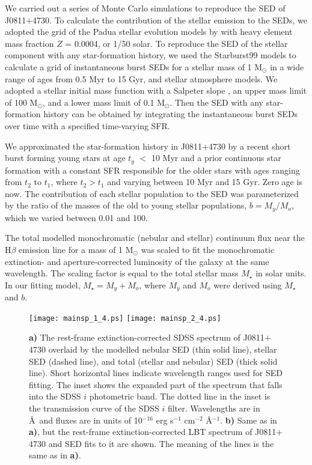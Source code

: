 \documentclass[useAMS,usenatbib]{mn2e}
\begin{document}
We carried out a series of Monte Carlo simulations to reproduce  the SED of
J0811$+$4730. To calculate the contribution of the  stellar  emission to the 
SEDs, we adopted the grid of the Padua stellar evolution models by \citet{G00}
with heavy element mass fraction $Z$ = 0.0004, or 1/50 solar. To reproduce the 
SED of the stellar component with any star-formation history, we used the 
{\sc Starburst99} models \citep{L99,L14} 
to calculate a grid of instantaneous
burst SEDs for a stellar mass of 1 M$_\odot$ in a wide range of ages
from 0.5 Myr to 15 Gyr, and \citet*{L97} stellar atmosphere models. 
We adopted a stellar initial mass function with a 
Salpeter slope \citep{S55}, an upper mass limit of 100 M$_\odot$, and a lower 
mass limit of 0.1 M$_\odot$. Then the SED with any star-formation history can 
be obtained by integrating the instantaneous burst SEDs over time with a 
specified time-varying SFR.

We approximated the star-formation history in J0811$+$4730
by a recent short burst forming young stars at age $t_y$ $<$ 10 Myr and a 
prior continuous star formation 
with a constant SFR responsible for the older stars with ages ranging from 
$t_2$ to $t_1$, where $t_2 > t_1$ and varying between 10 Myr and 
15 Gyr. Zero age is now. The contribution of each stellar population to the 
SED was parameterized by the ratio of the masses of the old to young stellar 
populations, $b=M_y/M_o$, which we varied between 0.01 and 100.

The total modelled  monochromatic (nebular and stellar)
continuum flux near the H$\beta$ emission line for a mass of 1 M$_\odot$
was scaled to fit the monochromatic extinction- and aperture-corrected 
luminosity of the galaxy at the same wavelength. The
scaling factor is equal to the total stellar mass $M_\star$ in solar units.
In our fitting model, $M_\star=M_y+M_o$, where $M_y$ and $M_o$ were derived 
using $M_\star$ and $b$.

\begin{figure}%
\texttt{[image: mainsp\_1\_4.ps]}
\texttt{[image: mainsp\_2\_4.ps]}
\caption{ {\bf a)} The rest-frame extinction-corrected SDSS spectrum of 
J0811$+$4730
overlaid by the modelled nebular SED (thin solid line), stellar SED (dashed
line), and total (stellar and nebular) SED (thick solid line).
Short horizontal lines indicate wavelength ranges used for SED fitting.
The inset shows the expanded part of the spectrum that falls into the SDSS $i$ 
photometric band. The dotted line in the inset is the transmission curve of the
SDSS $i$ filter. Wavelengths are in \AA\ and fluxes are in units of  
10$^{-16}$ erg s$^{-1}$ cm$^{-2}$ \AA$^{-1}$.
{\bf b)} Same as in {\bf a)}, but the rest-frame extinction-corrected LBT 
spectrum of J0811$+$4730 and SED fits to it are shown. The meaning of the lines is the
same as in {\bf a)}.}
\label{fig2}
\end{figure}
\end{document}
